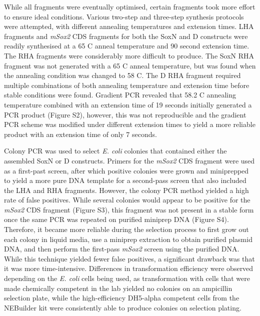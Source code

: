 \documentclass[withindex,glossary]{cam-thesis}
\begin{document}
While all fragments were eventually optimised, certain fragments took
more effort to ensure ideal conditions. Various two-step and three-step
synthesis protocols were attempted, with different annealing
temperatures and extension times. LHA fragments and \emph{mSox2} CDS
fragments for both the SoxN and D constructs were readily synthesised at
a 65 \textdegree{}C anneal temperature and 90 second extension time. The RHA
fragments were considerably more difficult to produce. The SoxN RHA
fragment was not generated with a 65 \textdegree{}C anneal temperature, but was
found when the annealing condition was changed to 58 \textdegree{}C. The D RHA
fragment required multiple combinations of both annealing temperature
and extension time before stable conditions were found. Gradient PCR
revealed that 58.2 \textdegree{}C annealing temperature combined with an extension
time of 19 seconds initially generated a PCR product (Figure S2),
however, this was not reproducible and the gradient PCR scheme was
modified under different extension times to yield a more reliable
product with an extension time of only 7 seconds.

Colony PCR was used to select \emph{E. coli} colonies that contained
either the assembled SoxN or D constructs. Primers for the \emph{mSox2}
CDS fragment were used as a first-past screen, after which positive
colonies were grown and miniprepped to yield a more pure DNA template
for a second-pass screen that also included the LHA and RHA fragments.
However, the colony PCR method yielded a high rate of false positives.
While several colonies would appear to be positive for the \emph{mSox2}
CDS fragment (Figure S3), this fragment was not present in a stable form
once the same PCR was repeated on purified miniprep DNA (Figure S4).
Therefore, it became more reliable during the selection process to first
grow out each colony in liquid media, use a miniprep extraction to
obtain purified plasmid DNA, and then perform the first-pass
\emph{mSox2} screen using the purified DNA. While this technique yielded
fewer false positives, a significant drawback was that it was more
time-intensive. Differences in transformation efficiency were observed
depending on the \emph{E. coli} cells being used, as transformation with
cells that were made chemically competent in the lab yielded no colonies
on an ampicillin selection plate, while the high-efficiency DH5-alpha
competent cells from the NEBuilder kit were consistently able to produce
colonies on selection plating.
\end{document}

